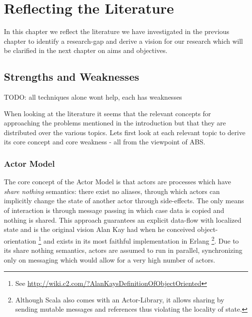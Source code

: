 \chapter{Reflecting the Literature}
\label{chap:refl}

In this chapter we reflect the literature we have investigated in the previous chapter to identify a research-gap and derive a vision for our research which will be clarified in the next chapter on aims and objectives.

\section{Strengths and Weaknesses}
TODO: all techniques alone wont help, each has weaknesses

When looking at the literature it seems that the relevant concepts for approaching the problems mentioned in the introduction but that they are distributed over the various topics. Lets first look at each relevant topic to derive its core concept and core weakness - all from the viewpoint of ABS.

\subsection{Actor Model}
The core concept of the Actor Model is that actors are processes which have \textit{share nothing} semantics: there exist no aliases, through which actors can implicitly change the state of another actor through side-effects. The only means of interaction is through message passing in which case data is copied and nothing is shared. This approach guarantees an explicit data-flow with localized state and is the original vision Alan Kay had when he conceived object-orientation \footnote{See \url{http://wiki.c2.com/?AlanKaysDefinitionOfObjectOriented}} and exists in its most faithful implementation in Erlang \footnote{Although Scala also comes with an Actor-Library, it allows sharing by sending mutable messages and references thus violating the locality of state.}. Due to its share nothing semantics, actors are assumed to run in parallel, synchronizing only on messaging which would allow for a very high number of actors.

